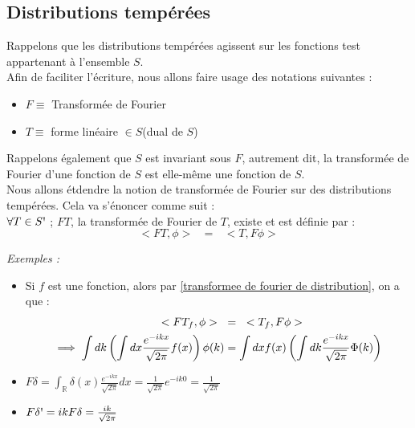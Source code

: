 \documentclass[../notesdecours.tex]{subfiles}
\begin{document}
\subsection{Distributions tempérées}
Rappelons que les distributions tempérées agissent sur les fonctions test appartenant à l'ensemble $S$. \\
Afin de faciliter l'écriture, nous allons faire usage des notations suivantes : 
\begin{itemize}[label= \textbullet]
    \item $F \equiv$ Transformée de Fourier 
    \item $T \equiv$ forme linéaire $\in S$\textquotesingle  (dual de $S$) 
\end{itemize}
Rappelons également que $S$ est invariant sous $F$, autrement dit, la transformée de Fourier d'une fonction de $S$ est elle-même une fonction de $S$. \\
Nous allons étdendre la notion de transformée de Fourier sur des distributions tempérées. Cela va s'énoncer comme suit : \\
$\forall T \in S \mbox{\textquotesingle}$ ; $FT$, la transformée de Fourier de $T$, existe et est définie par :
\begin{equation}
\label{transformee de fourier de distribution}
    <FT, \phi> \mbox{ } = \mbox{ } <T, F\phi >
\end{equation}

\textit{Exemples :} \begin{itemize}[label= \textbullet]
    \item Si $f$ est une fonction, alors par \ref{transformee de fourier de distribution}, on a que : 
    \begin{align}
        <F T_f, \phi> \mbox{ } &= \mbox{ } <T_f, F \phi> \notag \\
        \implies \int dk \left( \int dx \frac{e^{-ikx}}{\sqrt{2\pi}}f(x) \right) \phi(k) &= \int dx f(x) \left( \int dk \frac{e^{-ikx}}{\sqrt{2\pi}}\Phi(k) \right)
    \end{align}
    \item $F \delta = \int_{\mathbb{R}} \delta(x) \frac{e^{-ikx}}{\sqrt{2 \pi}} dx = \frac{1}{\sqrt{2 \pi}} e^{-ik0} = \frac{1}{\sqrt{2 \pi}}$
    \item $F \delta \mbox{\textquotesingle} = ikF\delta = \frac{ik}{\sqrt{2 \pi}}$
\end{itemize}

\end{document}
